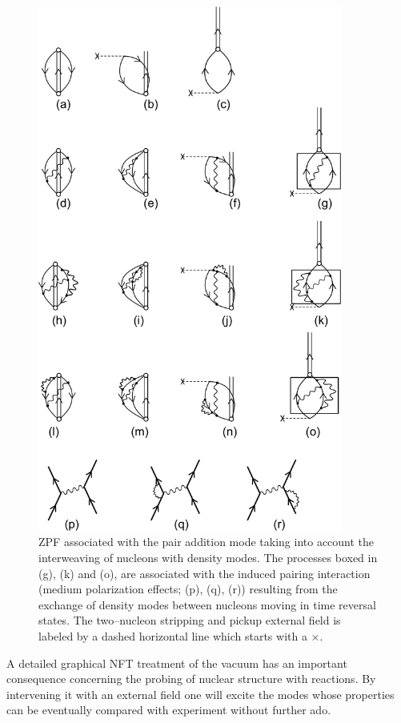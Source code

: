 \clearpage
\begin{figure}[h!]
\centerline {
\includegraphics*[width=10cm]{introduccion/figs/figintroA3}
}
\caption{ZPF associated with the pair addition mode taking into account the interweaving of nucleons with density modes. The processes boxed in (g), (k) and (o), are associated with the induced pairing interaction (medium polarization effects; (p), (q), (r)) resulting from the exchange of density modes between nucleons moving in time reversal states. The two--nucleon stripping and pickup external field is labeled by a dashed horizontal line which starts with a $\times$.}
\label{figintroA3}
\end{figure}
\clearpage

A detailed graphical NFT treatment of the vacuum has an important consequence concerning the probing of nuclear structure with reactions. By intervening it with an external field one will excite the modes whose properties can be eventually compared with experiment without further ado. 

